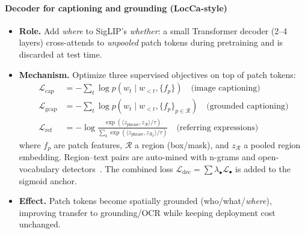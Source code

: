 \begin{enrichment}
\begin{enrichment}
        \paragraph{Decoder for captioning and grounding (LocCa-style)}
        \begin{itemize}
            \item \textbf{Role.} Add \emph{where} to SigLIP’s \emph{whether}: a small Transformer decoder (2–4 layers) cross-attends to \emph{unpooled} patch tokens during pretraining and is discarded at test time.
            \item \textbf{Mechanism.} Optimize three supervised objectives on top of patch tokens:
            \begin{align*}
                \mathcal{L}_\text{cap} &= -\sum_{t}\log p(w_t \mid w_{<t}, \{f_p\}) \quad\text{(image captioning)}\\
                \mathcal{L}_\text{gcap} &= -\sum_{t}\log p(w_t \mid w_{<t}, \{f_p\}_{p\in\mathcal{R}}) \quad\text{(grounded captioning)}\\
                \mathcal{L}_\text{ref} &= -\log\frac{\exp(\langle z_\text{phrase}, z_{\mathcal{R}}\rangle/\tau)}{\sum_k \exp(\langle z_\text{phrase}, z_{\mathcal{R}_k}\rangle/\tau)} \quad\text{(referring expressions)}
            \end{align*}
            where $f_p$ are patch features, $\mathcal{R}$ a region (box/mask), and $z_{\mathcal{R}}$ a pooled region embedding. Region–text pairs are auto-mined with n-grams and open-vocabulary detectors~\cite{wan2024_locca}. The combined loss $\mathcal{L}_\text{dec}=\sum \lambda_\bullet \mathcal{L}_\bullet$ is added to the sigmoid anchor.
            \item \textbf{Effect.} Patch tokens become spatially grounded (who/what/\emph{where}), improving transfer to grounding/OCR while keeping deployment cost unchanged.
        \end{itemize}
        

\end{enrichment}
\end{enrichment}

